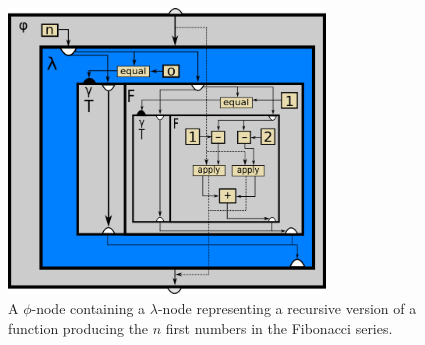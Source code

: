 
\begin{figure}[h!]
	\centering
	\includegraphics[width=0.75\textwidth]{figures/recursive_fibonacci}
	\caption{A $\phi$-node containing a $\lambda$-node representing a recursive
version of a function producing the $n$ first numbers in the Fibonacci series.}
	\label{fig:rec_fib_phi}
\end{figure}
